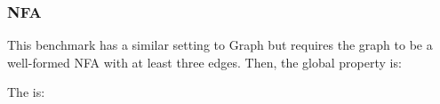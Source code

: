 \newpage
\subsubsection*{NFA} This benchmark has a similar setting to \textsf{Graph} but requires the graph to be a well-formed NFA with at least three edges. Then, the global property is:
\vspace{-.35cm}\par{}
\vspace{-.4cm}\par\nobreak\noindent
The \tyName{} is:
